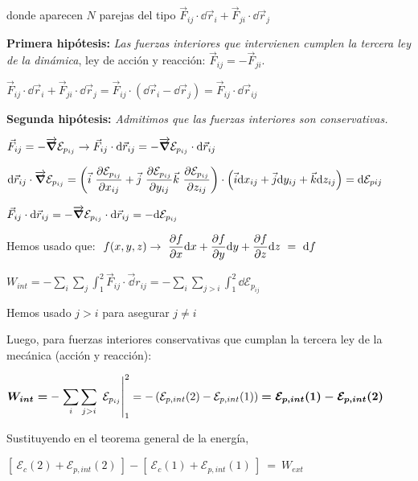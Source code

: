 donde aparecen $N$ parejas del tipo $\vec F_{ij} \cdot \dd \vec r_i + \vec F_{ji} \cdot \dd \vec r_j  $

\textbf{Primera hipótesis:} \emph{Las fuerzas interiores que intervienen cumplen la tercera ley de la dinámica}, ley de acción y reacción: $\vec F_{ij}=-\vec F_{ji}$.

$\vec F_{ij} \cdot \dd \vec r_i + \vec F_{ji} \cdot \dd \vec r_j= \vec F_{ij}\cdot (\dd \vec r_i - \dd \vec r_j)=\vec F_{ij}\cdot \dd \vec r_{ij}  $

\textbf{Segunda hipótesis:} \emph{Admitimos que las fuerzas interiores son conservativas.}

$\vec F_{ij}=-\overrightarrow{\grad}\mathcal E_{p_{ij}} \to \vec F_{ij}\cdot \dd \vec r_{ij}=-\overrightarrow{\grad}\mathcal E_{p_{ij}}\cdot \dd \vec r_{ij}$

\small{ $\dd \vec r_{ij} \cdot \overrightarrow{\grad}\mathcal E_{p_{ij}}= \displaystyle
 \left( \vec i \ \pdv{\mathcal E_{p_{ij}}}{x_{ij}} + 
        \vec j \ \pdv{\mathcal E_{p_{ij}}}{y_{ij}}
        \vec k \ \pdv{\mathcal E_{p_{ij}}}{z_{ij}}   \right) \cdot  
 \left( \vec i \dd x_{ij} + \vec j \dd y_{ij} + \vec k \dd z_{ij} \right) =\dd \mathcal E_{p{ij}}$}
 
 \normalsize{$\vec F_{ij}\cdot \dd \vec r_{ij}=-\overrightarrow{\grad}\mathcal E_{p_{ij}}\cdot \dd \vec r_{ij}=-\dd \mathcal E_{p_{ij}}$}


\textcolor{gris}{Hemos usado que: $\ f(x,y,z)\to \ \displaystyle \pdv{f}{x}\dd x+ \pdv{f}{y} \dd y + \pdv{f}{z} \dd z \ = \ \dd f$}

$W_{int}=\displaystyle -\sum_i \sum_j \int_1^2 \vec F_{ij} \cdot \vec \dd r_{ij}=-\sum_i \sum_{j>i} \int_1^2 \dd \mathcal E _{p_{ij}}$

\textcolor{gris}{Hemos usado $j>i$ para asegurar $j\neq i$}

Luego, para fuerzas interiores conservativas que cumplan la tercera ley de la mecánica (acción y reacción):

$\displaystyle \boldsymbol{ W_{int}=} -\eval{\sum_i \sum_{j>i} \ \mathcal E_{p_{ij}}}_1^2= -\left( \mathcal E_{p,int}(2)-\mathcal E_{p,int}(1) \right) \boldsymbol{ =\mathcal E_{p,int}(1)-\mathcal E_{p,int}(2) }$

Sustituyendo en el teorema general de la energía,

$\displaystyle 
\left[ \  \mathcal E_c(2) + \mathcal E_{p,int}(2) \  \right  ]-
\left[ \  \mathcal E_c(1) + \mathcal E_{p,int}(1) \  \right  ] \ = \
W_{ext}$



